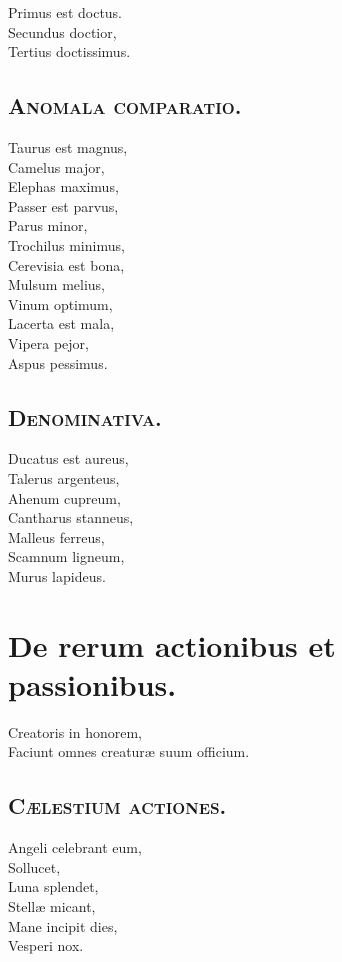 \documentclass[12pt, twocolumn]{memoir}
\begin{document}
Primus est doctus.\\
Secundus doctior,\\
Tertius doctissimus.\\

\section*{\textsc{Anomala comparatio.}}

Taurus est magnus,\\
Camelus major,\\
Elephas maximus,\\
Passer est parvus,\\
Parus minor,\\
Trochilus minimus,\\
Cerevisia est bona,\\
Mulsum melius,\\
Vinum optimum,\\
Lacerta est mala,\\
Vipera pejor,\\
Aspus pessimus.\\

\section*{\textsc{Denominativa.}}

Ducatus est aureus,\\
Talerus argenteus,\\
Ahenum cupreum,\\
Cantharus stanneus,\\
Malleus ferreus,\\
Scamnum ligneum,\\
Murus lapideus.\\

\chapter{De rerum actionibus et passionibus.}

Creatoris in honorem,\\
Faciunt omnes creaturæ suum officium.\\

\section*{\textsc{Cælestium actiones.}}

Angeli celebrant eum,\\
Sollucet,\\
Luna splendet,\\
Stellæ micant,\\
Mane incipit dies,\\
Vesperi nox.\\
\end{document}
